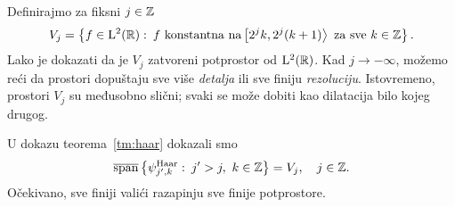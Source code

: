 \documentclass[main.tex]{subfiles}
\begin{document}
\begin{komentar}\label{kom:tmhaar2}
	Definirajmo za fiksni \( j \in \mathbb{Z} \)
	\begin{equation}
		V_j = \left\{ f \in \mathrm{L}^2(\mathbb{R}) \, \colon \,
		f \text{ konstantna na} \left[ 2^jk, 2^j(k+1) \right\rangle \text{ za sve } k \in \mathbb{Z}
		\right\}.
	\end{equation}
	Lako je dokazati da je \( V_j \) zatvoreni potprostor od \( \mathrm{L}^2(\mathbb{R}) \).
	Kad \( j \rightarrow -\infty \), možemo reći da prostori dopuštaju
	sve više \emph{detalja} ili sve finiju \emph{rezoluciju}.
	Istovremeno, prostori \( V_j \) su međusobno slični;
	svaki se može dobiti kao dilatacija bilo kojeg drugog.

	U dokazu teorema~\ref{tm:haar} dokazali smo
	\begin{equation}
		\operatorname{\overline{span}} \left\{ \psi^{\mathrm{Haar}}_{j',k} \, \colon \, j' > j,\ k \in \mathbb{Z} \right\}
		= V_j, \quad j \in \mathbb{Z}.
	\end{equation}
	Očekivano, sve finiji valići razapinju sve finije potprostore.
\end{komentar}
\end{document}
